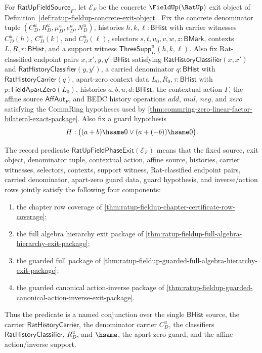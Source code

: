 \begin{definition}
\label{def:ratup-fieldup-phase-exit-record}
For $\mathsf{RatUpFieldSource}_F$, let $\mathcal E_F$ be the concrete
$\FieldUp(\RatUp)$ exit object of
Definition~\ref{def:ratup-fieldup-concrete-exit-object}. Fix the concrete
denominator tuple $(C_D^u,R_D^u,\mu_D^u,e_D^u,N_D^u)$, histories
$h,k,\ell:\mathsf{BHist}$ with carrier witnesses $C_D^u(h)$, $C_D^u(k)$, and
$C_D^u(\ell)$, selectors $s,t,u_0,v,w,z:\mathsf{BMark}$, contexts
$L,R,r:\mathsf{BHist}$, and a support witness
$\mathsf{ThreeSupp}_D^u(h,k,\ell)$. Also fix Rat-classified endpoint pairs
$x,x',y,y':\mathsf{BHist}$ satisfying
$\mathsf{RatHistoryClassifier}(x,x')$ and
$\mathsf{RatHistoryClassifier}(y,y')$, a carried denominator
$q:\mathsf{BHist}$ with $\mathsf{RatHistoryCarrier}(q)$, apart-zero context
data $L_0,R_0,\tau:\mathsf{BHist}$ with
$p:\mathsf{FieldApartZero}(L_0)$, histories $a,b,u,d:\mathsf{BHist}$, the
contextual action $\Gamma$, the affine source $\mathsf{AffAut}_F$, and BEDC
history operations $add$, $mul$, $neg$, and $zero$ satisfying the CommRing
hypotheses used by
\autoref{thm:commring-zero-linear-factor-bilateral-exact-package}. Also fix a
guard hypothesis
$$
H:\bigl((a+b)\hsame0 \lor (a+(-b))\hsame0\bigr).
$$

The record predicate $\mathsf{RatUpFieldPhaseExit}(\mathcal E_F)$ means that
the fixed source, exit object, denominator tuple, contextual action, affine
source, histories, carrier witnesses, selectors, contexts, support witness,
Rat-classified endpoint pairs, carried denominator, apart-zero guard data,
guard hypothesis, and inverse/action rows jointly satisfy the following four
components:
\begin{enumerate}
  \item the chapter row coverage of
  \autoref{thm:ratup-fieldup-chapter-certificate-row-coverage};
  \item the full algebra hierarchy exit package of
  \autoref{thm:ratup-fieldup-full-algebra-hierarchy-exit-package};
  \item the guarded full package of
  \autoref{thm:ratup-fieldup-guarded-full-algebra-hierarchy-exit-package};
  \item the guarded canonical action-inverse package of
  \autoref{thm:ratup-fieldup-guarded-canonical-action-inverse-exit-package}.
\end{enumerate}
Thus the predicate is a named conjunction over the single
$\mathsf{BHist}$ source, the carrier $\mathsf{RatHistoryCarrier}$, the
denominator carrier $C_D^u$, the classifiers $\mathsf{RatHistoryClassifier}$,
$R_D^u$, and $\hsame$, the apart-zero guard, and the affine action/inverse
support.
\end{definition}

